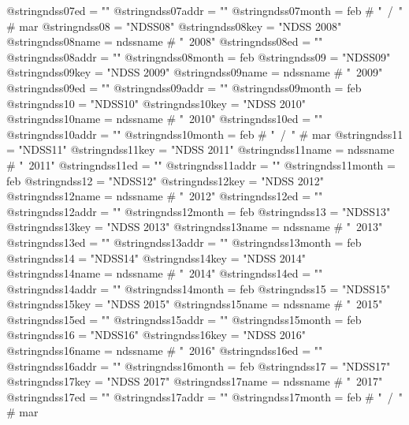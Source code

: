 @string{ndss07ed =              ""}
@string{ndss07addr =            ""}
@string{ndss07month =           feb # "~/~" # mar}
@string{ndss08 =                "NDSS08"}
@string{ndss08key =             "NDSS 2008"}
@string{ndss08name =            ndssname # "~2008"}
@string{ndss08ed =              ""}
@string{ndss08addr =            ""}
@string{ndss08month =           feb}
@string{ndss09 =                "NDSS09"}
@string{ndss09key =             "NDSS 2009"}
@string{ndss09name =            ndssname # "~2009"}
@string{ndss09ed =              ""}
@string{ndss09addr =            ""}
@string{ndss09month =           feb}
@string{ndss10 =                "NDSS10"}
@string{ndss10key =             "NDSS 2010"}
@string{ndss10name =            ndssname # "~2010"}
@string{ndss10ed =              ""}
@string{ndss10addr =            ""}
@string{ndss10month =           feb # "~/~" # mar}
@string{ndss11 =                "NDSS11"}
@string{ndss11key =             "NDSS 2011"}
@string{ndss11name =            ndssname # "~2011"}
@string{ndss11ed =              ""}
@string{ndss11addr =            ""}
@string{ndss11month =           feb}
@string{ndss12 =                "NDSS12"}
@string{ndss12key =             "NDSS 2012"}
@string{ndss12name =            ndssname # "~2012"}
@string{ndss12ed =              ""}
@string{ndss12addr =            ""}
@string{ndss12month =           feb}
@string{ndss13 =                "NDSS13"}
@string{ndss13key =             "NDSS 2013"}
@string{ndss13name =            ndssname # "~2013"}
@string{ndss13ed =              ""}
@string{ndss13addr =            ""}
@string{ndss13month =           feb}
@string{ndss14 =                "NDSS14"}
@string{ndss14key =             "NDSS 2014"}
@string{ndss14name =            ndssname # "~2014"}
@string{ndss14ed =              ""}
@string{ndss14addr =            ""}
@string{ndss14month =           feb}
@string{ndss15 =                "NDSS15"}
@string{ndss15key =             "NDSS 2015"}
@string{ndss15name =            ndssname # "~2015"}
@string{ndss15ed =              ""}
@string{ndss15addr =            ""}
@string{ndss15month =           feb}
@string{ndss16 =                "NDSS16"}
@string{ndss16key =             "NDSS 2016"}
@string{ndss16name =            ndssname # "~2016"}
@string{ndss16ed =              ""}
@string{ndss16addr =            ""}
@string{ndss16month =           feb}
@string{ndss17 =                "NDSS17"}
@string{ndss17key =             "NDSS 2017"}
@string{ndss17name =            ndssname # "~2017"}
@string{ndss17ed =              ""}
@string{ndss17addr =            ""}
@string{ndss17month =           feb # "~/~" # mar}
